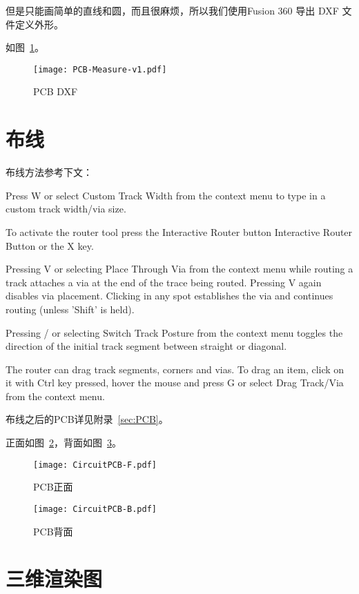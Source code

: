 但是只能画简单的直线和圆，而且很麻烦，所以我们使用Fusion 360 导出 DXF 文件定义外形。

如图~\ref{fig:PCB-Measure-v1}。

\begin{figure}[htbp]
    \centering
    \texttt{[image: PCB-Measure-v1.pdf]}
    \caption{PCB DXF}
    \label{fig:PCB-Measure-v1}
\end{figure}


\section{布线}

布线方法参考下文：

Press W or select Custom Track Width from the context menu to type in a custom track width/via size.

To activate the router tool press the Interactive Router button Interactive Router Button or the X key. 

Pressing V or selecting Place Through Via from the context menu while routing a track attaches a via at the end of the trace being routed. Pressing V again disables via placement. Clicking in any spot establishes the via and continues routing (unless 'Shift' is held).

Pressing / or selecting Switch Track Posture from the context menu toggles the direction of the initial track segment between straight or diagonal.

The router can drag track segments, corners and vias. To drag an item, click on it with Ctrl key pressed, hover the mouse and press G or select Drag Track/Via from the context menu.

布线之后的PCB详见附录~\ref{sec:PCB}。

正面如图~\ref{fig:CircuitPCB-F}，背面如图~\ref{fig:CircuitPCB-B}。

\begin{figure}[htbp]
    \centering
    \texttt{[image: CircuitPCB-F.pdf]}
    \caption{PCB正面}
    \label{fig:CircuitPCB-F}
\end{figure}

\begin{figure}[htbp]
    \centering
    \texttt{[image: CircuitPCB-B.pdf]}
    \caption{PCB背面}
    \label{fig:CircuitPCB-B}
\end{figure}

\section{三维渲染图}

